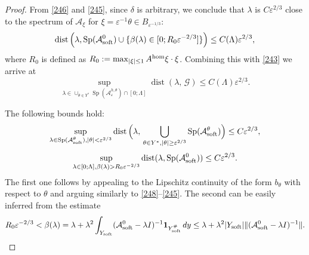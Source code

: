 \documentclass[11pt]{article}
\newcommand\e {\varepsilon}
\newcommand\soft{{\rm soft}}
\def\AA{\mathcal{A}}
\def\l{\lambda}
\def\hom{{\rm hom}}
\DeclareMathOperator{\Sp}{Sp}
\newcommand\dist{\operatorname{dist}}
\theoremstyle{remark}
\begin{document}
\begin{proof}
	From \eqref{246} and \eqref{245}, since $\delta$ is arbitrary, we conclude that $\l$ is $C \e^{2/3} $ close to the spectrum of  $\AA_\xi$ for  $\xi = \e^{-1} \theta \in B_{\e^{-1/3}}$:
 \begin{equation*}%
		\dist\Big(  \l , \Sp(\AA_\soft^0) \cup\{ \beta(\l) \in [0;R_0 \e^{-2/3}] \}  \Big) \leq C(\Lambda) \e^{2/3},
	\end{equation*}
	where $R_0$ is defined as $R_0:=\max_{|\xi|\leq 1}  A^\hom \xi \cdot \xi $.
 Combining this with \eqref{243} we arrive at 	
 \begin{equation*}%
		\sup_{\l\in  \cup_{\theta\in Y^*} \Sp (\AA_\e^{h,\theta}) \cap [0;\Lambda]}\dist(  \l, \,\mathcal{G} ) \leq C(\Lambda) \e^{2/3}.
	\end{equation*}

 \medskip

 The following bounds hold:
	\begin{equation}\label{255}
		\sup_{\l\in \Sp(\AA_\soft^\theta), |\theta | < \e^{2/3}}\dist \Big( \l,\,\bigcup_{\theta\in Y^*, |\theta |\geq \e^{2/3}}\Sp(\AA_\soft^\theta)   \Big) \leq C  \e^{2/3},
	\end{equation}
	\begin{equation}\label{255a}
		\sup_{\l\in [0;\Lambda], \beta(\l) > R_0 \e^{-2/3}  } \dist(\l, \Sp(\AA_\soft^0))\leq  C \e^{2/3}.
	\end{equation}
	The first one follows by appealing  to the Lipschitz continuity of the form $b_\theta$ with respect to $\theta$ and arguing similarly to \eqref{248}--\eqref{245}. The second can be easily inferred from the estimate
	\begin{equation*}
		R_0 \e^{-2/3} <\beta(\l) =  \lambda+\lambda^2 \int_{Y_\soft } (\AA_\soft ^0-\l I)^{-1} \mathbf{1}_{Y_\soft^{\#}}\, dy \leq \l+\l^2 |Y_\soft| \|(\AA_\soft ^0-\l I)^{-1}\|.
	\end{equation*}
	



\medskip


\end{proof}
\end{document}
